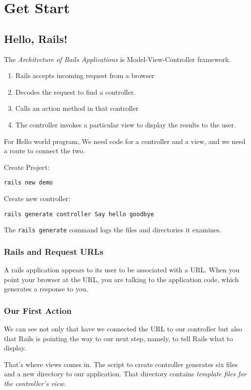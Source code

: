 \documentclass[11pt, a4paper]{book}
\begin{document}
\chapter{Get Start}
\section{Hello, Rails!}
The \emph{Architecture of Rails Applications} is Model-View-Controller
framework.
\begin{enumerate}
\item Rails accepts incoming request from a browser
\item Decodes the request to find a controller.
\item Calls an action method in that controller
\item The controller invokes a particular view to display the results to the
user.
\end{enumerate}
For Hello world program, We need code for a controller and a view, and we need a route to connect the two.

Create Project:
\begin{verbatim}
rails new demo
\end{verbatim}

Create new controller:
\begin{verbatim}
rails generate controller Say hello goodbye
\end{verbatim}

The \verb|rails generate| command logs the files and directories it examines.

\subsection{Rails and Request URLs}
A rails application appears to its user to be associated with a URL. When you
point your browser at the URL, you are talking to the application code, which
generates a response to you.

\subsection{Our First Action}
We can see not only that have we connected the URL to our controller but also
that Rails is pointing the way to our next step, namely, to tell Rails what to
display.

That's where views comes in. The script to create controller generates six files
and a new directory to our application. That directory contains \emph{template
files for the controller's view}. 
\end{document}
